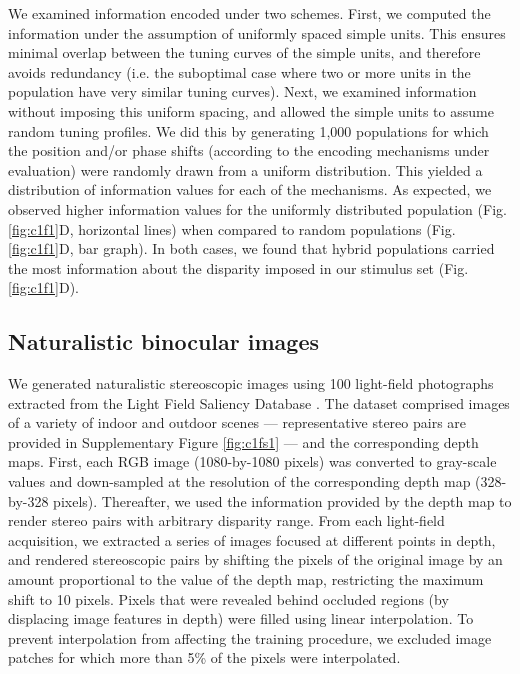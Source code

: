 We examined information encoded under two schemes. First, we computed the information under the assumption of uniformly spaced simple units. This ensures minimal overlap between the tuning curves of the simple units, and therefore avoids redundancy (i.e. the suboptimal case where two or more units in the population have very similar tuning curves). Next, we examined information without imposing this uniform spacing, and allowed the simple units to assume random tuning profiles. We did this by generating 1,000 populations for which the position and/or phase shifts (according to the encoding mechanisms under evaluation) were randomly drawn from a uniform distribution. This yielded a distribution of information values for each of the mechanisms. As expected, we observed higher information values for the uniformly distributed population (Fig. \ref{fig:c1f1}D, horizontal lines) when compared to random populations (Fig. \ref{fig:c1f1}D, bar graph). In both cases, we found that hybrid populations carried the most information about the disparity imposed in our stimulus set (Fig. \ref{fig:c1f1}D).

\subsection*{Naturalistic binocular images}

We generated naturalistic stereoscopic images using 100 light-field photographs extracted from the Light Field Saliency Database \cite{Li:2014ik}. The dataset comprised images of a variety of indoor and outdoor scenes --- representative stereo pairs are provided in Supplementary Figure \ref{fig:c1fs1} --- and the corresponding depth maps. First, each RGB image (1080-by-1080 pixels) was converted to gray-scale values and down-sampled at the resolution of the corresponding depth map (328-by-328 pixels). Thereafter, we used the information provided by the depth map to render stereo pairs with arbitrary disparity range. From each light-field acquisition, we extracted a series of images focused at different points in depth, and rendered stereoscopic pairs by shifting the pixels of the original image by an amount proportional to the value of the depth map, restricting the maximum shift to 10 pixels. Pixels that were revealed behind occluded regions (by displacing image features in depth) were filled using linear interpolation. To prevent interpolation from affecting the training procedure, we excluded image patches for which more than 5\% of the pixels were interpolated. 

